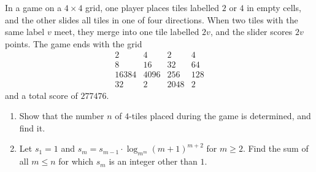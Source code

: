 In a game on a $4\times4$ grid, one player places tiles labelled $2$ or $4$ in empty cells, and the other slides all tiles in one of four directions. When two tiles with the same label $v$ meet, they merge into one tile labelled $2v$, and the slider scores $2v$ points. The game ends with the grid
\[\begin{array}{cccc}2&4&2&4\\8&16&32&64\\16384&4096&256&128\\32&2&2048&2\end{array}\]
and a total score of $277476$.
\begin{enumerate}
\item[(a)] Show that the number $n$ of $4$-tiles placed during the game is determined, and find it.
\item[(b)] Let $s_1=1$ and $s_m=s_{m-1}\cdot\log_{m^m}(m+1)^{m+2}$ for $m\ge2$. Find the sum of all $m\le n$ for which $s_m$ is an integer other than $1$.
\end{enumerate}
